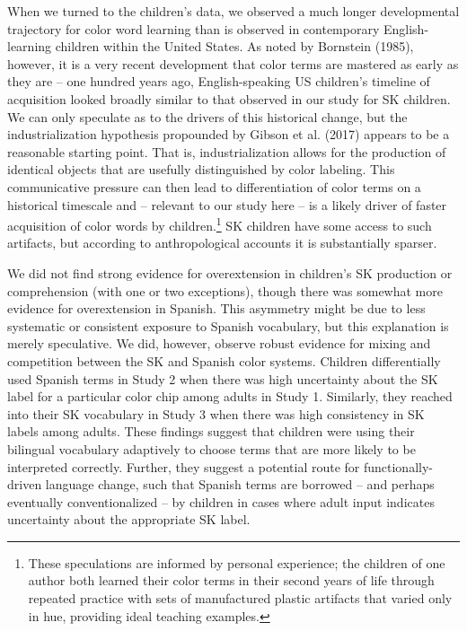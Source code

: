 \documentclass[
  english,
  ,apa7,floatsintext]{apa6}
\begin{document}
When we turned to the children's data, we observed a much longer developmental trajectory for color word learning than is observed in contemporary English-learning children within the United States. As noted by Bornstein (1985), however, it is a very recent development that color terms are mastered as early as they are -- one hundred years ago, English-speaking US children's timeline of acquisition looked broadly similar to that observed in our study for SK children. We can only speculate as to the drivers of this historical change, but the industrialization hypothesis propounded by Gibson et al. (2017) appears to be a reasonable starting point. That is, industrialization allows for the production of identical objects that are usefully distinguished by color labeling. This communicative pressure can then lead to differentiation of color terms on a historical timescale and -- relevant to our study here -- is a likely driver of faster acquisition of color words by children.\footnote{These speculations are informed by personal experience; the children of one author both learned their color terms in their second years of life through repeated practice with sets of manufactured plastic artifacts that varied only in hue, providing ideal teaching examples.} SK children have some access to such artifacts, but according to anthropological accounts it is substantially sparser.

We did not find strong evidence for overextension in children's SK production or comprehension (with one or two exceptions), though there was somewhat more evidence for overextension in Spanish. This asymmetry might be due to less systematic or consistent exposure to Spanish vocabulary, but this explanation is merely speculative. We did, however, observe robust evidence for mixing and competition between the SK and Spanish color systems. Children differentially used Spanish terms in Study 2 when there was high uncertainty about the SK label for a particular color chip among adults in Study 1. Similarly, they reached into their SK vocabulary in Study 3 when there was high consistency in SK labels among adults. These findings suggest that children were using their bilingual vocabulary adaptively to choose terms that are more likely to be interpreted correctly. Further, they suggest a potential route for functionally-driven language change, such that Spanish terms are borrowed -- and perhaps eventually conventionalized -- by children in cases where adult input indicates uncertainty about the appropriate SK label.
\end{document}
